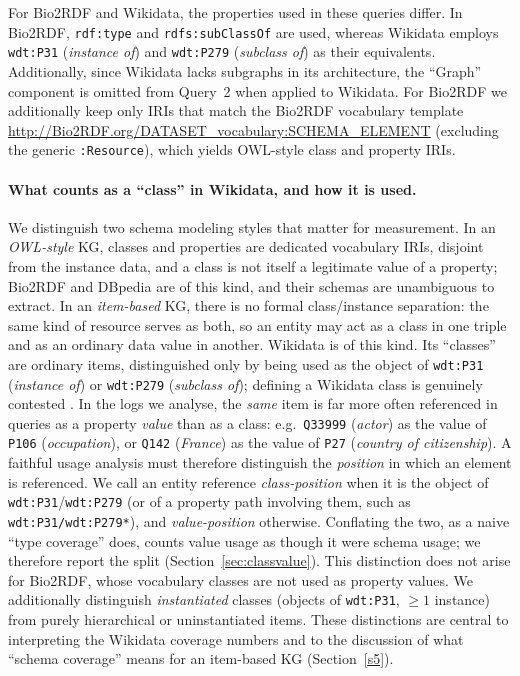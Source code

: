 \documentclass[sw]{iosart2x}
\begin{document}
For Bio2RDF and Wikidata, the properties used in these queries differ. In Bio2RDF, \texttt{rdf:type} and \texttt{rdfs:subClassOf} are used, whereas Wikidata employs \texttt{wdt:P31} (\emph{instance of}) and \texttt{wdt:P279} (\emph{subclass of}) as their equivalents. Additionally, since Wikidata lacks subgraphs in its architecture, the ``Graph'' component is omitted from Query~2 when applied to Wikidata. For Bio2RDF we additionally keep only IRIs that match the Bio2RDF vocabulary template \url{http://Bio2RDF.org/DATASET_vocabulary:SCHEMA_ELEMENT} (excluding the generic \texttt{:Resource}), which yields OWL-style class and property IRIs.

\paragraph{\textbf{What counts as a ``class'' in Wikidata, and how it is used.}} We distinguish two schema modeling styles that matter for measurement. In an \emph{OWL-style} KG, classes and properties are dedicated vocabulary IRIs, disjoint from the instance data, and a class is not itself a legitimate value of a property; Bio2RDF and DBpedia are of this kind, and their schemas are unambiguous to extract. In an \emph{item-based} KG, there is no formal class/instance separation: the same kind of resource serves as both, so an entity may act as a class in one triple and as an ordinary data value in another. Wikidata is of this kind. Its ``classes'' are ordinary items, distinguished only by being used as the object of \texttt{wdt:P31} (\emph{instance of}) or \texttt{wdt:P279} (\emph{subclass of}); defining a Wikidata class is genuinely contested \cite{brasileiro2016applying,piscopo2018who,patelschneider2024class}. In the logs we analyse, the \emph{same} item is far more often referenced in queries as a property \emph{value} than as a class: e.g.\ \texttt{Q33999} (\emph{actor}) as the value of \texttt{P106} (\emph{occupation}), or \texttt{Q142} (\emph{France}) as the value of \texttt{P27} (\emph{country of citizenship}). A faithful usage analysis must therefore distinguish the \emph{position} in which an element is referenced. We call an entity reference \emph{class-position} when it is the object of \texttt{wdt:P31}/\texttt{wdt:P279} (or of a property path involving them, such as \texttt{wdt:P31/wdt:P279*}), and \emph{value-position} otherwise. Conflating the two, as a naive ``type coverage'' does, counts value usage as though it were schema usage; we therefore report the split (Section~\ref{sec:classvalue}). This distinction does not arise for Bio2RDF, whose vocabulary classes are not used as property values. We additionally distinguish \emph{instantiated} classes (objects of \texttt{wdt:P31}, $\geq 1$ instance) from purely hierarchical or uninstantiated items. These distinctions are central to interpreting the Wikidata coverage numbers and to the discussion of what ``schema coverage'' means for an item-based KG (Section~\ref{s5}).
\end{document}
